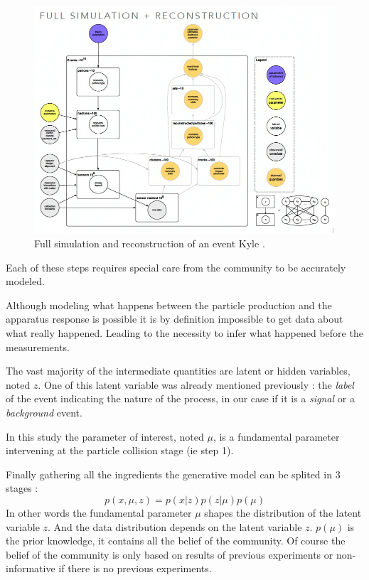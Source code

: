 \begin{figure}[htb]
    \centering
    \includegraphics[width=0.8\linewidth]{KyleSimulator.png}
    \caption{Full simulation and reconstruction of an event \needcite Kyle .}
    \label{fig:kyle_simulator}
\end{figure}



Each of these steps requires special care from the community to be accurately modeled.

Although modeling what happens between the particle production and the apparatus response is possible it is by definition impossible to get data about what really happened.
Leading to the necessity to infer what happened before the measurements.


The vast majority of the intermediate quantities are latent or hidden variables, noted $z$.
One of this latent variable was already mentioned previously : the \emph{label} of the event indicating the nature of the process, in our case if it is a \emph{signal} or a \emph{background} event.


In this study the parameter of interest, noted $\mu$, is a fundamental parameter intervening at the particle collision stage (ie step 1).

Finally gathering all the ingredients the generative model can be splited in 3 stages :
\begin{equation}
	\label{eq:model_simple}
	p(x, \mu, z) = p(x|z) p(z | \mu) p(\mu)
\end{equation}
In other words the fundamental parameter $\mu$ shapes the distribution of the latent variable $z$.
And the data distribution depends on the latent variable $z$.
$p(\mu)$ is the prior knowledge, it contains all the belief of the community.
Of course the belief of the community is only based on results of previous experiments or non-informative if there is no previous experiments.

